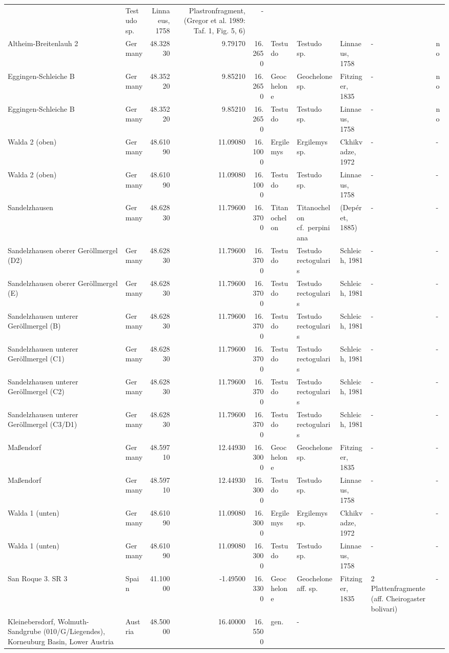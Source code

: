 \documentclass[]{article}
\begin{document}
\begin{longtable}[]{@{}llrrrlllll@{}}
& Testudo sp. & Linnaeus, 1758 & Plastronfragment, (Gregor et al. 1989:
Taf. 1, Fig. 5, 6) & -\tabularnewline
Altheim-Breitenlauh 2 & Germany & 48.32830 & 9.79170 & 16.2650 & Testudo
& Testudo sp. & Linnaeus, 1758 & - & no\tabularnewline
Eggingen-Schleiche B & Germany & 48.35220 & 9.85210 & 16.2650 &
Geochelone & Geochelone sp. & Fitzinger, 1835 & - & no\tabularnewline
Eggingen-Schleiche B & Germany & 48.35220 & 9.85210 & 16.2650 & Testudo
& Testudo sp. & Linnaeus, 1758 & - & no\tabularnewline
Walda 2 (oben) & Germany & 48.61090 & 11.09080 & 16.1000 & Ergilemys &
Ergilemys sp. & Ckhikvadze, 1972 & - & -\tabularnewline
Walda 2 (oben) & Germany & 48.61090 & 11.09080 & 16.1000 & Testudo &
Testudo sp. & Linnaeus, 1758 & - & -\tabularnewline
Sandelzhausen & Germany & 48.62830 & 11.79600 & 16.3700 & Titanochelon &
Titanochelon cf.~perpiniana & (Depéret, 1885) & - & -\tabularnewline
Sandelzhausen oberer Geröllmergel (D2) & Germany & 48.62830 & 11.79600 &
16.3700 & Testudo & Testudo rectogularis & Schleich, 1981 & - &
-\tabularnewline
Sandelzhausen oberer Geröllmergel (E) & Germany & 48.62830 & 11.79600 &
16.3700 & Testudo & Testudo rectogularis & Schleich, 1981 & - &
-\tabularnewline
Sandelzhausen unterer Geröllmergel (B) & Germany & 48.62830 & 11.79600 &
16.3700 & Testudo & Testudo rectogularis & Schleich, 1981 & - &
-\tabularnewline
Sandelzhausen unterer Geröllmergel (C1) & Germany & 48.62830 & 11.79600
& 16.3700 & Testudo & Testudo rectogularis & Schleich, 1981 & - &
-\tabularnewline
Sandelzhausen unterer Geröllmergel (C2) & Germany & 48.62830 & 11.79600
& 16.3700 & Testudo & Testudo rectogularis & Schleich, 1981 & - &
-\tabularnewline
Sandelzhausen unterer Geröllmergel (C3/D1) & Germany & 48.62830 &
11.79600 & 16.3700 & Testudo & Testudo rectogularis & Schleich, 1981 & -
& -\tabularnewline
Maßendorf & Germany & 48.59710 & 12.44930 & 16.3000 & Geochelone &
Geochelone sp. & Fitzinger, 1835 & - & -\tabularnewline
Maßendorf & Germany & 48.59710 & 12.44930 & 16.3000 & Testudo & Testudo
sp. & Linnaeus, 1758 & - & -\tabularnewline
Walda 1 (unten) & Germany & 48.61090 & 11.09080 & 16.3000 & Ergilemys &
Ergilemys sp. & Ckhikvadze, 1972 & - & -\tabularnewline
Walda 1 (unten) & Germany & 48.61090 & 11.09080 & 16.3000 & Testudo &
Testudo sp. & Linnaeus, 1758 & - & -\tabularnewline
San Roque 3. SR 3 & Spain & 41.10000 & -1.49500 & 16.3300 & Geochelone &
Geochelone aff. sp. & Fitzinger, 1835 & 2 Plattenfragmente (aff.
Cheirogaster bolivari) & -\tabularnewline
Kleinebersdorf, Wolmuth-Sandgrube (010/G/Liegendes), Korneuburg Basin,
Lower Austria & Austria & 48.50000 & 16.40000 & 16.5500 & gen. & - &

\end{longtable}
\end{document}
